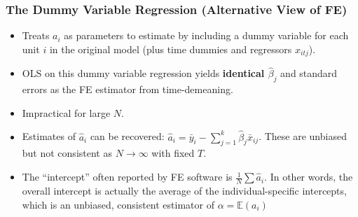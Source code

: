 \documentclass[a4paper, 10pt]{article}
\theoremstyle{definition}	%
\begin{document}
\subsubsection{The Dummy Variable Regression (Alternative View of FE)}
\begin{itemize}
    \item Treats \(a_i\) as parameters to estimate by including a dummy variable for each unit \(i\) in the original model (plus time dummies and regressors \(x_{itj}\)).
    \item OLS on this dummy variable regression yields \textbf{identical \(\hat{\beta}_j\)} and standard errors as the FE estimator from time-demeaning.
    \item Impractical for large \(N\).
    \item Estimates of \(\hat{a}_i\) can be recovered: \(\hat{a}_i = \bar{y}_i - \sum_{j=1}^{k} \hat{\beta}_j \bar{x}_{ij}\). These are unbiased but not consistent as \(N \to \infty\) with fixed \(T\).
    \item The ``intercept'' often reported by FE software is \(\frac{1}{N}\sum \hat{a}_i\). In other words, the overall intercept is actually the average of
the individual-specific intercepts, which is an unbiased, consistent estimator of
$\alpha = \mathbb{E}(a_i)$
\end{itemize}
\end{document}
